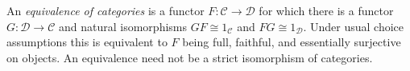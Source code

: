 
An \emph{equivalence of categories} is a functor $F:\mathcal C\to\mathcal D$ for which there is a functor $G:\mathcal D\to\mathcal C$ and natural isomorphisms $GF\cong 1_{\mathcal C}$ and $FG\cong 1_{\mathcal D}$. Under usual choice assumptions this is equivalent to $F$ being full, faithful, and essentially surjective on objects. An equivalence need not be a strict isomorphism of categories.
